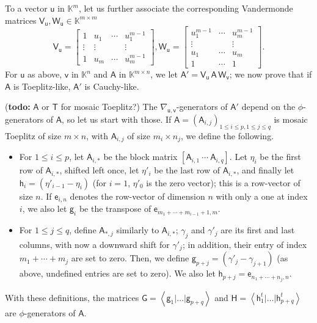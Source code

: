 \documentclass{sig-alternate}
\newcommand{\ve}{\ensuremath{\mathsf{e}}}
\newcommand{\vg}{\ensuremath{\mathsf{g}}}
\newcommand{\vh}{\ensuremath{\mathsf{h}}}
\newcommand{\vu}{\ensuremath{\mathsf{u}}}
\newcommand{\vv}{\ensuremath{\mathsf{v}}}
\newcommand{\mA}{\ensuremath{\mathsf{A}}}
\newcommand{\mG}{\ensuremath{\mathsf{G}}}
\newcommand{\mH}{\ensuremath{\mathsf{H}}}
\newcommand{\mT}{\ensuremath{\mathsf{T}}}
\newcommand{\mV}{\ensuremath{\mathsf{V}}}
\newcommand{\mW}{\ensuremath{\mathsf{W}}}
\newcommand{\K}{\ensuremath{\mathbb{K}}}
\newcommand{\todo}[1]{(\textbf{todo:} #1)}
\begin{document}
To a vector $\vu$ in $\K^m$, let us further associate the
corresponding Vandermonde matrices $\mV_\vu, \mW_\vu \in \K^{m \times
  m}$
$$
\mV_\vu = 
\begin{bmatrix}
  1 & u_1 & \cdots & u_1^{m - 1}\\
  \vdots & \vdots &  & \vdots\\
  1 & u_m & \cdots & u_m^{m - 1}
\end{bmatrix},
\mW_\vu = 
\begin{bmatrix}
  u_1^{m - 1} & \cdots & u_m^{m - 1}\\
  \vdots &  & \vdots\\
  u_1 & \cdots & u_m\\
  1 & \cdots & 1
\end{bmatrix}.
$$
For $\vu$ as above, $\vv$ in $\K^n$ and $\mA$ in $\K^{m\times n}$, we
let $\mA' = \mV_\vu\, \mA\, \mW_\vv$; we now prove that if $\mA$ is Toeplitz-like,
 $\mA'$ is Cauchy-like. 

\todo{$\mA$ or $\mT$ for mosaic Toeplitz?}
The $\nabla_{\vu,\vv}$-generators of $\mA'$ depend on the
$\phi$-generators of $\mA$, so let us start with those. If
$\mA=(\mA_{i,j})_{1 \le i \le p,1 \le j \le q}$ is mosaic Toeplitz of
size $m \times n$, with $\mA_{i,j}$ of size $m_i \times n_j$, we
define the following.
\begin{itemize}
\item For $1 \le i \le p$, let $\mA_{i,*}$ be the block matrix
  $[\mA_{i,1}~\cdots~\mA_{i,q}]$.  Let $\eta_i$ be the first row of $\mA_{i,*}$,
  shifted left once, let $\eta'_i$ be the last row of $\mA_{i,*}$, and finally
  let $\vh_i=(\eta'_{i-1}-\eta_i)$ (for $i=1$, $\eta'_0$ is the zero vector);
  this is a row-vector of size $n$. If $\ve_{i,n}$ denotes the row-vector of
  dimension $n$ with only a one at index $i$, we also let $\vg_{i}$ be the
  transpose of $\ve_{m_1 + \cdots +m_{i-1}+1,m}$.
  
\item For $1 \le j \le q$, define $\mA_{*,j}$ similarly to $\mA_{i,*}$;
  $\gamma_j$ and $\gamma'_j$ are its first and last columns, with now a downward
  shift for $\gamma'_j$; in addition, their entry of index $m_1 + \cdots + m_j$
  are set to zero. Then, we define $\vg_{p+j}=(\gamma'_{j}-\gamma_{j+1})$ (as
  above, undefined entries are set to zero).  We also let
  $\vh_{p+j}=\ve_{n_1 + \cdots +n_j,n}$.
\end{itemize}
With these definitions, the matrices
$\mG=\left< \vg_1 | \dots | \vg_{p+q} \right>$ and
$\mH= \left<\vh^t_1 | \dots | \vh^t_{p+q} \right>$ are $\phi$-generators of
$\mA$.
\end{document}
